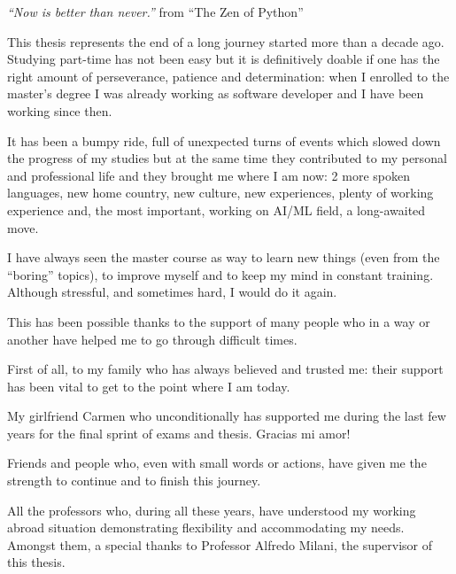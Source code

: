 \thispagestyle{empty}

\begin{flushright}
    {\Huge\textit{``Now is better than never.''}}
    \linebreak
    \linebreak
    from ``The Zen of Python''
\end{flushright}

\clearpage

\thispagestyle{empty}

This thesis represents the end of a long journey started more than a decade
ago. Studying part-time has not been easy but it is definitively doable if one
has the right amount of perseverance, patience and determination: when I
enrolled to the master's degree I was already working as software developer and
I have been working since then.

\medskip

It has been a bumpy ride, full of unexpected turns of events which slowed
down the progress of my studies but at the same time they contributed to my
personal and professional life and they brought me where I am now: 2 more
spoken languages, new home country, new culture, new experiences, plenty of
working experience and, the most important, working on AI/ML field, a
long-awaited move.

I have always seen the master course as way to learn new things (even from the
``boring'' topics), to improve myself and to keep my mind in constant training.
Although stressful, and sometimes hard, I would do it again.

\medskip

This has been possible thanks to the support of many people who in a way or
another have helped me to go through difficult times.

First of all, to my family who has always believed and trusted me: their
support has been vital to get to the point where I am today.

My girlfriend Carmen who unconditionally has supported me during the last few
years for the final sprint of exams and thesis. Gracias mi amor!

Friends and people who, even with small words or actions, have given me the
strength to continue and to finish this journey.

\medskip

All the professors who, during all these years, have understood my working
abroad situation demonstrating flexibility and accommodating my needs.
Amongst them, a special thanks to Professor Alfredo Milani, the supervisor of
this thesis.

